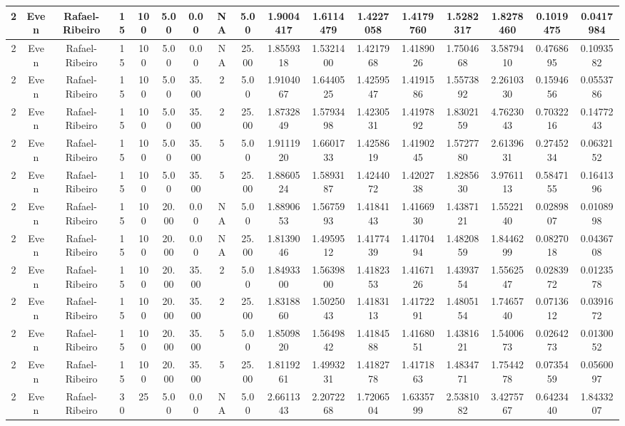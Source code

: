 \begin{longtable}{ | c | c | c | c | c | c | c | c | c | c | c | c | c | c | c | c | c | }
	\hline
	2	&	Even	&	Rafael-Ribeiro	&	15	&	100	&	5.00	&	0.00	&	NA	&	5.00	&	1.9004417	&	1.6114479	&	1.4227058	&	1.4179760	&	1.5282317	&	1.8278460	&	0.1019475	&	0.0417984 \\
	\hline
	2	&	Even	&	Rafael-Ribeiro	&	15	&	100	&	5.00	&	0.00	&	NA	&	25.00	&	1.8559318	&	1.5321400	&	1.4217968	&	1.4189026	&	1.7504668	&	3.5879410	&	0.4768695	&	0.1093582 \\
	\hline
	2	&	Even	&	Rafael-Ribeiro	&	15	&	100	&	5.00	&	35.00	&	2	&	5.00	&	1.9104067	&	1.6440525	&	1.4259547	&	1.4191586	&	1.5573892	&	2.2610330	&	0.1594656	&	0.0553786 \\
	\hline
	2	&	Even	&	Rafael-Ribeiro	&	15	&	100	&	5.00	&	35.00	&	2	&	25.00	&	1.8732849	&	1.5793498	&	1.4230531	&	1.4197892	&	1.8302159	&	4.7623043	&	0.7032216	&	0.1477243 \\
	\hline
	2	&	Even	&	Rafael-Ribeiro	&	15	&	100	&	5.00	&	35.00	&	5	&	5.00	&	1.9111920	&	1.6601733	&	1.4258619	&	1.4190245	&	1.5727780	&	2.6139631	&	0.2745234	&	0.0632152 \\
	\hline
	2	&	Even	&	Rafael-Ribeiro	&	15	&	100	&	5.00	&	35.00	&	5	&	25.00	&	1.8860524	&	1.5893187	&	1.4244072	&	1.4202738	&	1.8285630	&	3.9761113	&	0.5847155	&	0.1641396 \\
	\hline
	2	&	Even	&	Rafael-Ribeiro	&	15	&	100	&	20.00	&	0.00	&	NA	&	5.00	&	1.8890653	&	1.5675993	&	1.4184143	&	1.4166930	&	1.4387121	&	1.5522140	&	0.0289807	&	0.0108998 \\
	\hline
	2	&	Even	&	Rafael-Ribeiro	&	15	&	100	&	20.00	&	0.00	&	NA	&	25.00	&	1.8139046	&	1.4959512	&	1.4177439	&	1.4170494	&	1.4820859	&	1.8446299	&	0.0827018	&	0.0436708 \\
	\hline
	2	&	Even	&	Rafael-Ribeiro	&	15	&	100	&	20.00	&	35.00	&	2	&	5.00	&	1.8493300	&	1.5639800	&	1.4182353	&	1.4167126	&	1.4393754	&	1.5562547	&	0.0283972	&	0.0123578 \\
	\hline
	2	&	Even	&	Rafael-Ribeiro	&	15	&	100	&	20.00	&	35.00	&	2	&	25.00	&	1.8318860	&	1.5025043	&	1.4183113	&	1.4172291	&	1.4805154	&	1.7465740	&	0.0713612	&	0.0391672 \\
	\hline
	2	&	Even	&	Rafael-Ribeiro	&	15	&	100	&	20.00	&	35.00	&	5	&	5.00	&	1.8509820	&	1.5649842	&	1.4184588	&	1.4168051	&	1.4381621	&	1.5400673	&	0.0264273	&	0.0130052 \\
	\hline
	2	&	Even	&	Rafael-Ribeiro	&	15	&	100	&	20.00	&	35.00	&	5	&	25.00	&	1.8119261	&	1.4993231	&	1.4182778	&	1.4171863	&	1.4834771	&	1.7544278	&	0.0735459	&	0.0560097 \\
	\hline
	2	&	Even	&	Rafael-Ribeiro	&	30	&	25	&	5.00	&	0.00	&	NA	&	5.00	&	2.6611343	&	2.2072268	&	1.7206504	&	1.6335799	&	2.5381082	&	3.4275767	&	0.6423440	&	1.8433207 \\

\end{longtable}
